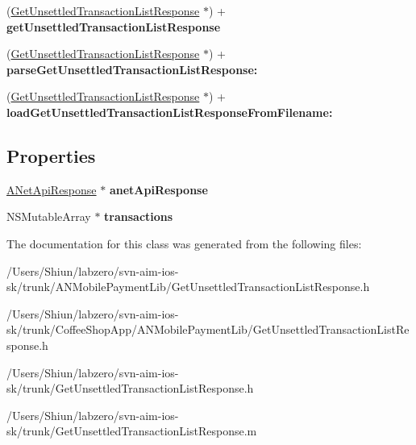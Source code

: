 \begin{DoxyCompactItemize}
\item 
\hypertarget{interface_get_unsettled_transaction_list_response_acf62d89fb958421576f93242364f95f0}{
(\hyperlink{interface_get_unsettled_transaction_list_response}{GetUnsettledTransactionListResponse} $\ast$) + {\bfseries getUnsettledTransactionListResponse}}
\label{interface_get_unsettled_transaction_list_response_acf62d89fb958421576f93242364f95f0}

\item 
\hypertarget{interface_get_unsettled_transaction_list_response_a68f7d525743e540145f0f84bd0544019}{
(\hyperlink{interface_get_unsettled_transaction_list_response}{GetUnsettledTransactionListResponse} $\ast$) + {\bfseries parseGetUnsettledTransactionListResponse:}}
\label{interface_get_unsettled_transaction_list_response_a68f7d525743e540145f0f84bd0544019}

\item 
\hypertarget{interface_get_unsettled_transaction_list_response_a286cba77a71383111bc9d36ca71d42be}{
(\hyperlink{interface_get_unsettled_transaction_list_response}{GetUnsettledTransactionListResponse} $\ast$) + {\bfseries loadGetUnsettledTransactionListResponseFromFilename:}}
\label{interface_get_unsettled_transaction_list_response_a286cba77a71383111bc9d36ca71d42be}

\end{DoxyCompactItemize}
\subsection*{Properties}
\begin{DoxyCompactItemize}
\item 
\hypertarget{interface_get_unsettled_transaction_list_response_af39b2a12b3bc7b5a2ef675248004005f}{
\hyperlink{interface_a_net_api_response}{ANetApiResponse} $\ast$ {\bfseries anetApiResponse}}
\label{interface_get_unsettled_transaction_list_response_af39b2a12b3bc7b5a2ef675248004005f}

\item 
\hypertarget{interface_get_unsettled_transaction_list_response_a4b6d4c959a377e56de5ac6ae620b025b}{
NSMutableArray $\ast$ {\bfseries transactions}}
\label{interface_get_unsettled_transaction_list_response_a4b6d4c959a377e56de5ac6ae620b025b}

\end{DoxyCompactItemize}


The documentation for this class was generated from the following files:\begin{DoxyCompactItemize}
\item 
/Users/Shiun/labzero/svn-\/aim-\/ios-\/sk/trunk/ANMobilePaymentLib/GetUnsettledTransactionListResponse.h\item 
/Users/Shiun/labzero/svn-\/aim-\/ios-\/sk/trunk/CoffeeShopApp/ANMobilePaymentLib/GetUnsettledTransactionListResponse.h\item 
/Users/Shiun/labzero/svn-\/aim-\/ios-\/sk/trunk/GetUnsettledTransactionListResponse.h\item 
/Users/Shiun/labzero/svn-\/aim-\/ios-\/sk/trunk/GetUnsettledTransactionListResponse.m\end{DoxyCompactItemize}
